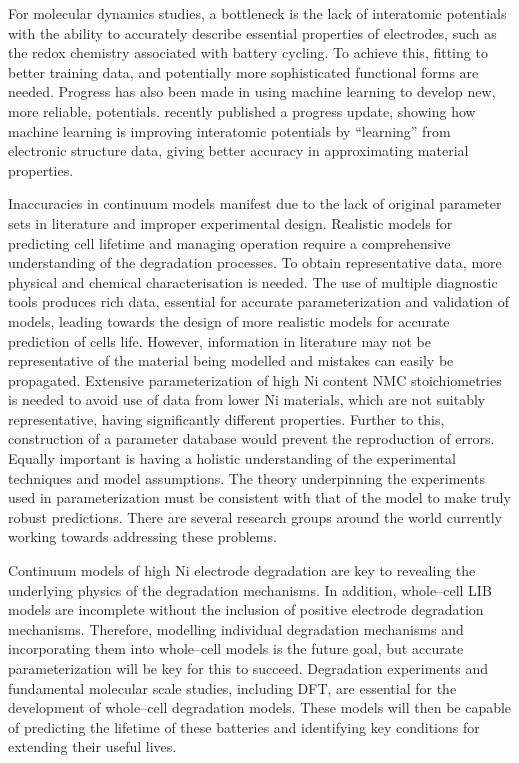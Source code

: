 \documentclass[journal=jacsat,manuscript=article]{achemso}
\begin{document}
For molecular dynamics studies, a bottleneck is the lack of interatomic potentials with the ability to accurately describe essential properties of electrodes, such as the redox chemistry associated with battery cycling.
To achieve this, fitting to better training data, and potentially more sophisticated functional forms are needed.
Progress has also been made in using machine learning to develop new, more reliable, potentials. \citeauthor{deringer2019machine} recently published a progress update, showing how machine learning is improving interatomic potentials by ``learning'' from electronic structure data, giving better accuracy in approximating material properties.\cite{deringer2019machine}

Inaccuracies in continuum models manifest due to the lack of original parameter sets in literature and improper experimental design.
Realistic models for predicting cell lifetime and managing operation require a comprehensive understanding of the degradation processes.
To obtain representative data, more physical and chemical characterisation is needed.
The use of multiple diagnostic tools produces rich data, essential for accurate parameterization and validation of models, leading towards the design of more realistic models for accurate prediction of cells life.
However, information in literature may not be representative of the material being modelled and mistakes can easily be propagated.\cite{Howey_2020}
Extensive parameterization of high Ni content NMC stoichiometries is needed to avoid use of data from lower Ni materials, which are not suitably representative, having significantly different properties.
Further to this, construction of a parameter database would prevent the reproduction of errors.
Equally important is having a holistic understanding of the experimental techniques and model assumptions.
The theory underpinning the experiments used in parameterization must be consistent with that of the model to make truly robust predictions.
There are several research groups around the world currently working towards addressing these problems.

Continuum models of high Ni electrode degradation are key to revealing the underlying physics of the degradation mechanisms.
In addition, whole--cell LIB models are incomplete without the inclusion of positive electrode degradation mechanisms.
Therefore, modelling individual degradation mechanisms and incorporating them into whole--cell models is the future goal, but accurate parameterization will be key for this to succeed.
Degradation experiments and fundamental molecular scale studies, including DFT, are essential for the development of whole--cell degradation models.\cite{Sulzer_2020}
These models will then be capable of predicting the lifetime of these batteries and identifying key conditions for extending their useful lives.
\end{document}
